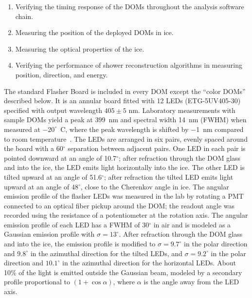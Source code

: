 \begin{enumerate}
\item Verifying the timing response of the DOMs throughout the analysis
  software chain.
\item Measuring the position of the deployed DOMs in ice.
\item Measuring the optical properties of the ice.
\item Verifying the performance of shower reconstruction algorithms
  in measuring position, direction, and energy.
\end{enumerate}

The standard Flasher Board is
included in every DOM except the ``color DOMs''
described below. It is an annular board fitted with 12 LEDs (ETG-5UV405-30)
specified with output wavelength $405\pm5$ nm.  Laboratory
measurements with sample DOMs yield a peak at
\qty{399}{nm} and spectral width \qty{14}{nm} (FWHM) when measured at
$-20^{\circ}$~C, where the peak wavelength is shifted by 
\qty{-1}{nm} compared to room temperature~\cite{Aartsen:2013rt}.
The LEDs are arranged in six pairs, evenly spaced around the board
with a 60$^{\circ}$ separation between adjacent pairs. One LED in each pair
is pointed downward at an angle of 10.7$^{\circ}$; after refraction through the DOM glass and into
the ice, the LED
emits light horizontally into the ice. The other LED is tilted upward
at an angle of 51.6$^{\circ}$; after refraction the tilted LED
emits light upward at an angle 
of 48$^{\circ}$, close to the Cherenkov angle in ice. The angular
emission profile of the flasher LEDs was measured in the lab by
rotating a PMT connected to an
optical fiber pickup around the DOM; the readout angle was recorded
using the resistance of a potentiometer at the rotation axis.
The angular emission profile of each LED has a FWHM of
30$^{\circ}$ in air and is modeled as a Gaussian emission profile
with $\sigma = 13^{\circ}$. After refraction through the DOM glass and into
the ice, the emission profile is modified to $\sigma = 9.7^{\circ}$ in the polar direction
and $9.8^{\circ}$ in the azimuthal direction for the tilted LEDs, and $\sigma=9.2^{\circ}$ in the polar direction
and $10.1^{\circ}$ in the azimuthal direction for the horizontal LEDs.
About 10\% of the light is emitted outside the Gaussian beam, modeled by
a secondary profile proportional to $(1+\cos{\alpha})$, where $\alpha$ is the angle
away from the LED axis.

